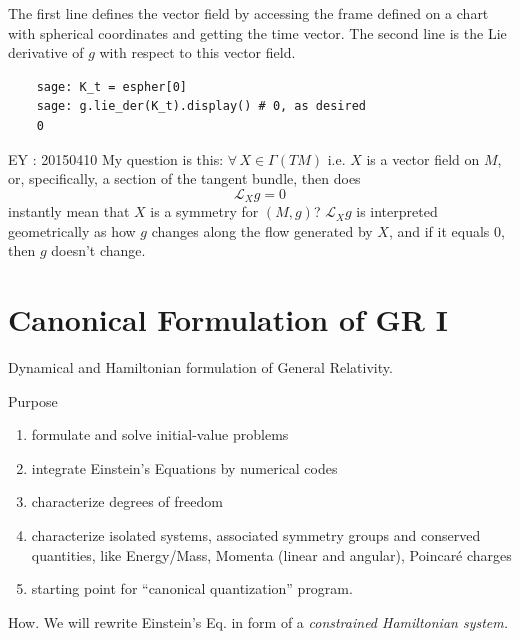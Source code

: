 	
	The first line defines the vector field by accessing the frame defined on a chart with spherical coordinates and getting the time vector.  The second line is the Lie derivative of $g$ with respect to this vector field.
	\begin{verbatim}
	sage: K_t = espher[0]
	sage: g.lie_der(K_t).display() # 0, as desired
	0
	\end{verbatim}
	
	EY : 20150410 My question is this: $\forall \, X \in \Gamma(TM)$ i.e. $X$ is a vector field on $M$, or, specifically, a section of the tangent bundle, then does
	\[
	\mathcal{L}_Xg = 0 
	\]
	instantly mean that $X$ is a symmetry for $(M,g)$?  $\mathcal{L}_Xg$ is interpreted geometrically as how $g$ changes along the flow generated by $X$, and if it equals $0$, then $g$ doesn't change.  
	
	\section{}
	
	\section{}
	
	\section{Canonical Formulation of GR I}
	
	Dynamical and Hamiltonian formulation of General Relativity.
	
	Purpose
	\begin{enumerate}
		\item[(1)] formulate and solve initial-value problems
		\item[(2)] integrate Einstein's Equations by numerical codes
		\item[(3)] characterize degrees of freedom
		\item[(4)] characterize isolated systems, associated symmetry groups and conserved quantities, like Energy/Mass, Momenta (linear and angular), Poincar\'e charges
		\item[(5)] starting point for ``canonical quantization'' program.
	\end{enumerate}
	
	How. We will rewrite Einstein's Eq. in form of a \emph{constrained Hamiltonian system.}  
	
